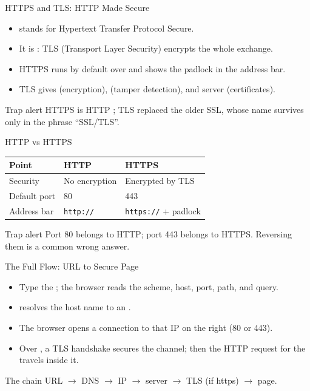 \documentclass[aspectratio=169]{beamer}
\begin{document}
\begin{frame}{HTTPS and TLS: HTTP Made Secure}
  \begin{itemize}
    \item {} stands for Hypertext Transfer Protocol Secure.
    \item It is : TLS (Transport Layer Security)
      encrypts the whole exchange.
    \item HTTPS runs by default over  and shows the padlock
      in the address bar.
    \item TLS gives  (encryption), 
      (tamper detection), and server  (certificates).
  \end{itemize}
  \begin{alertblock}{Trap alert}
    HTTPS is HTTP ; TLS replaced the older SSL, whose name
    survives only in the phrase ``SSL/TLS''.
  \end{alertblock}
\end{frame}

\begin{frame}{HTTP vs HTTPS}
  \begin{center}
    \begin{tabular}{lll}
      \toprule
      \textbf{Point} & \textbf{HTTP} & \textbf{HTTPS} \\
      \midrule
      Security & No encryption & Encrypted by TLS \\
      Default port & 80 & 443 \\
      Address bar & \texttt{http://} & \texttt{https://} + padlock \\
      \bottomrule
    \end{tabular}
  \end{center}
  \vspace{0.35cm}
  \begin{alertblock}{Trap alert}
    Port 80 belongs to HTTP; port 443 belongs to HTTPS. Reversing them is a
    common wrong answer.
  \end{alertblock}
\end{frame}

\begin{frame}{The Full Flow: URL to Secure Page}
  \begin{itemize}
    \item Type the ; the browser reads the scheme, host, port,
      path, and query.
    \item {} resolves the host name to an .
    \item The browser opens a connection to that IP on the right
       (80 or 443).
    \item Over , a TLS handshake secures the channel; then the
      HTTP request for the  travels inside it.
  \end{itemize}
  \begin{block}{The chain}
    URL $\rightarrow$ DNS $\rightarrow$ IP $\rightarrow$ server $\rightarrow$
    TLS (if https) $\rightarrow$ page.
  \end{block}
\end{frame}
\end{document}
